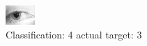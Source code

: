 \begin{figure}[h!]
\begin{center}
\includegraphics[width=0.60\columnwidth]{figures/ID1363_class_4_target_3.png}
\end{center}
\caption{ Classification: 4 actual target: 3}
\label{fig:ID1363_class_4_target_3}
\end{figure}
